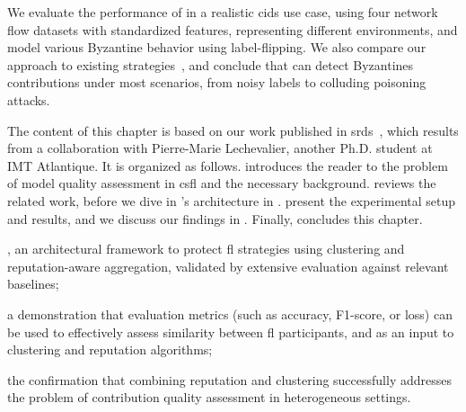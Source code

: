 We evaluate the performance of \thecontrib in a realistic \gls{cids} use case, using four network flow datasets with standardized features, representing different environments, and model various Byzantine behavior using label-flipping.
We also compare our approach to existing strategies~\cite{mcmahan_Communicationefficientlearningdeep_2017,fung_LimitationsFederatedLearning_2020}, and conclude that \thecontrib can detect Byzantines contributions under most scenarios, from noisy labels to colluding poisoning attacks. 

The content of this chapter is based on our work published in \gls{srds}~\cite{lavaur_radar_2024}, which results from a collaboration with Pierre-Marie Lechevalier, another Ph.D. student at IMT Atlantique.
It is organized as follows.
 introduces the reader to the problem of model quality assessment in \gls{csfl} and the necessary background.
 reviews the related work, before we dive in \thecontrib's architecture in .
 present the experimental setup and results, and we discuss our findings in .
Finally,  concludes this chapter.

\begin{contribs}
  \item \thecontrib, an architectural framework to protect \gls{fl} strategies using clustering and reputation-aware aggregation, validated by extensive evaluation against relevant baselines;
  \item a demonstration that evaluation metrics (such as accuracy, F1-score, or loss) can be used to effectively assess similarity between \gls{fl} participants, and as an input to clustering and reputation algorithms;
  \item the confirmation that combining reputation and clustering successfully addresses the problem of contribution quality assessment in heterogeneous settings.
\end{contribs}
